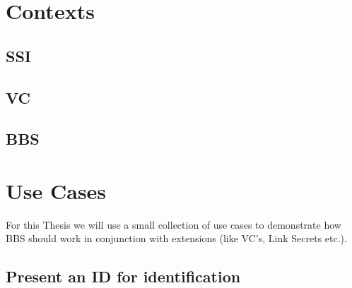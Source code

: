\documentclass[
	a4paper               %
	,bibliography=totoc   %
	,listof=totoc         %
	,monolingual
	twoside=false,
]{bfhthesis}              %
\begin{document}

\chapter{Contexts}

\section{SSI}

\section{VC}

\section{BBS}

\chapter{Use Cases}
For this Thesis we will use a small collection of use cases to demonstrate how BBS should work in conjunction with extensions (like VC's, Link Secrets etc.).

\section{Present an ID for identification}
\label{sec:presid}
\end{document}
